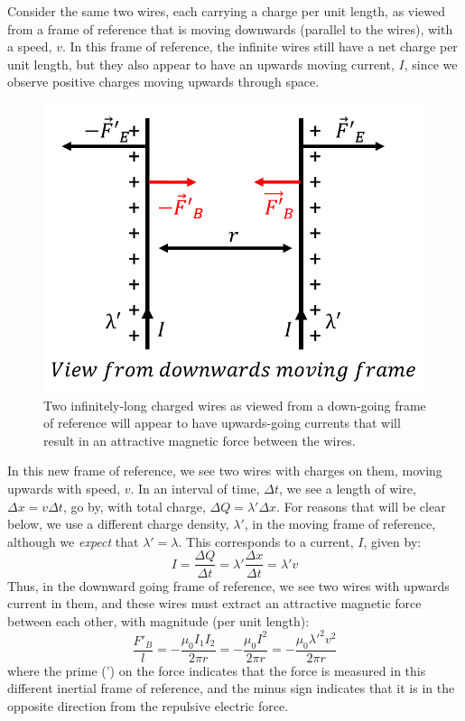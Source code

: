 Consider the same two wires, each carrying a charge per unit length, as viewed from a frame of reference that is moving downwards (parallel to the wires), with a speed, $v$. In this frame of reference, the infinite wires still have a net charge per unit length, but they also appear to have an upwards moving current, $I$, since we observe positive charges moving upwards through space.

\begin{figure}[!htbp]
\centering
\includegraphics[width=0.4\linewidth]{files/twowire_magnetic-535a8de6057d101e2e69bb7bd86ee6ae.png}
\caption[]{Two infinitely-long charged wires as viewed from a down-going frame of reference will appear to have upwards-going currents that will result in an attractive magnetic force between the wires.}
\label{fig:specialrelativity:twowire_magnetic}
\end{figure}

In this new frame of reference, we see two wires with charges on them, moving upwards with speed, $v$. In an interval of time, $\Delta t$, we see a length of wire, $\Delta x=v\Delta t$, go by, with total charge, $\Delta Q=\lambda' \Delta x$. For reasons that will be clear below, we use a different charge density, $\lambda'$, in the moving frame of reference, although we \textit{expect} that $\lambda'=\lambda$. This corresponds to a current, $I$, given by:
\begin{equation}
I=\frac{\Delta Q}{\Delta t}=\lambda'\frac{\Delta x}{\Delta t}=\lambda' v
\end{equation}
Thus, in the downward going frame of reference, we see two wires with upwards current in them, and these wires must extract an attractive magnetic force between each other, with magnitude (per unit length):
\begin{equation}
\frac{F'_B}{l} = -\frac{\mu_0 I_1I_2}{2\pi r}=-\frac{\mu_0 I^2}{2\pi r}=-\frac{\mu_0 \lambda'^2 v^2}{2\pi r}
\end{equation}
where the prime (') on the force indicates that the force is measured in this different inertial frame of reference, and the minus sign indicates that it is in the opposite direction from the repulsive electric force.

